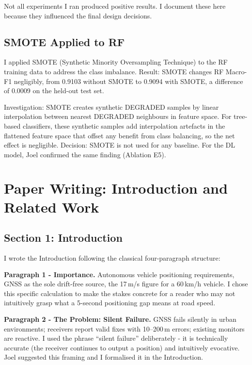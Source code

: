\documentclass[12pt,a4paper]{article}
\begin{document}
Not all experiments I ran produced positive results.
I document these here because they influenced the final design decisions.

\subsection{SMOTE Applied to RF}

I applied SMOTE (Synthetic Minority Oversampling Technique) \cite{chawla2002smote}
to the RF training data to address the class imbalance.
Result: SMOTE changes RF Macro-F1 negligibly, from 0.9103 without SMOTE to 0.9094 with
SMOTE, a difference of 0.0009 on the held-out test set.

Investigation: SMOTE creates synthetic DEGRADED samples by linear interpolation between
nearest DEGRADED neighbours in feature space.
For tree-based classifiers, these synthetic samples add interpolation artefacts in the
flattened feature space that offset any benefit from class balancing, so the net effect
is negligible.
Decision: SMOTE is not used for any baseline.
For the DL model, Joel confirmed the same finding (Ablation E5).

\section{Paper Writing: Introduction and Related Work}

\subsection{Section 1: Introduction}

I wrote the Introduction following the classical four-paragraph structure:

\textbf{Paragraph 1 - Importance.}
Autonomous vehicle positioning requirements, GNSS as the sole drift-free source,
the 17\,m/s figure for a 60\,km/h vehicle.
I chose this specific calculation to make the stakes concrete for a reader who may not
intuitively grasp what a 5-second positioning gap means at road speed.

\textbf{Paragraph 2 - The Problem: Silent Failure.}
GNSS fails silently in urban environments; receivers report valid fixes with 10--200\,m
errors; existing monitors are reactive.
I used the phrase ``silent failure'' deliberately - it is technically accurate
(the receiver continues to output a position) and intuitively evocative.
Joel suggested this framing and I formalised it in the Introduction.
\end{document}
